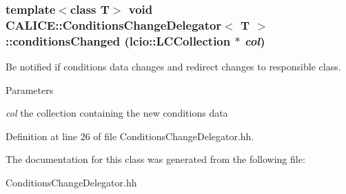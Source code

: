 \subsubsection[{conditionsChanged}]{\setlength{\rightskip}{0pt plus 5cm}template$<$class T$>$ void {\bf CALICE::ConditionsChangeDelegator}$<$ T $>$::conditionsChanged (lcio::LCCollection $\ast$ {\em col})\hspace{0.3cm}{\ttfamily  [inline]}}\label{classCALICE_1_1ConditionsChangeDelegator_a4eae95674a704dd8d59a6fb4ca1490ea}


Be notified if conditions data changes and redirect changes to responsible class. 
\begin{DoxyParams}{Parameters}
\item[{\em col}]the collection containing the new conditions data \end{DoxyParams}


Definition at line 26 of file ConditionsChangeDelegator.hh.

The documentation for this class was generated from the following file:\begin{DoxyCompactItemize}
\item 
ConditionsChangeDelegator.hh\end{DoxyCompactItemize}
